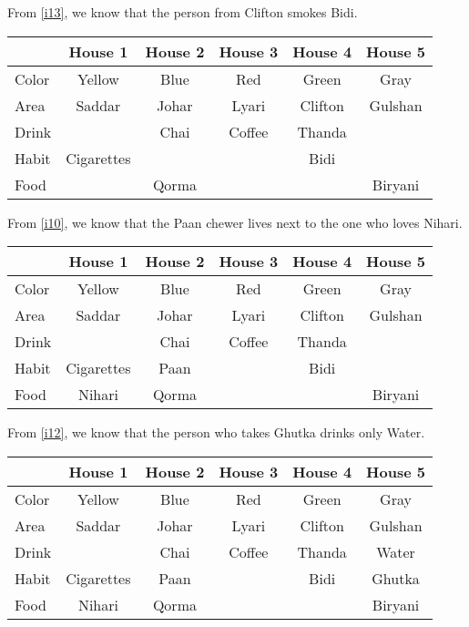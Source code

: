 \documentclass[a4paper]{exam}
\newcommand\cb{\color{blue}}
\begin{document}
\begin{questions}
\begin{solution}
    From \ref{i13}, we know that the person from Clifton smokes Bidi. \\
    \begin{tabular}{l||*5{c|}}
      & \textbf{House 1} & \textbf{\cb House 2} & \textbf{House 3} & \textbf{House 4} & \textbf{House 5} \\
      \hline\hline
      Color & Yellow & Blue & Red& Green & Gray\\\hline
      Area & Saddar & Johar& Lyari & Clifton & Gulshan\\\hline
      Drink & & Chai&Coffee & Thanda & \\\hline
      Habit & Cigarettes& & &Bidi & \\\hline
      Food & & Qorma & & & Biryani\\\hline
      \end{tabular}

    From \ref{i10}, we know that the Paan chewer lives next to the one who loves Nihari. \\
    \begin{tabular}{l||*5{c|}}
      & \textbf{House 1} & \textbf{\cb House 2} & \textbf{House 3} & \textbf{House 4} & \textbf{House 5} \\
      \hline\hline
      Color & Yellow & Blue & Red& Green & Gray\\\hline
      Area & Saddar & Johar& Lyari & Clifton & Gulshan\\\hline
      Drink & & Chai&Coffee & Thanda & \\\hline
      Habit & Cigarettes&  Paan & &Bidi & \\\hline
      Food &Nihari & Qorma & & & Biryani\\\hline
      \end{tabular}

       From \ref{i12}, we know that the person who takes Ghutka drinks only Water. \\
    \begin{tabular}{l||*5{c|}}
      & \textbf{House 1} & \textbf{\cb House 2} & \textbf{House 3} & \textbf{House 4} & \textbf{House 5} \\
      \hline\hline
      Color & Yellow & Blue & Red& Green & Gray\\\hline
      Area & Saddar & Johar& Lyari & Clifton & Gulshan\\\hline
      Drink & & Chai&Coffee & Thanda & Water\\\hline
      Habit & Cigarettes&  Paan & &Bidi & Ghutka\\\hline
      Food &Nihari & Qorma & & & Biryani\\\hline
      \end{tabular}


\end{solution}
\end{questions}
\end{document}
